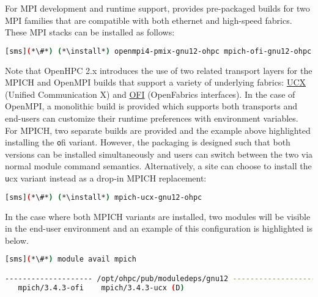 For MPI development and runtime support, \OHPC{} provides pre-packaged builds
for two MPI families that are compatible with both ethernet and high-speed
fabrics.  These MPI stacks can be installed as follows:

\begin{lstlisting}[language=bash]
[sms](*\#*) (*\install*) openmpi4-pmix-gnu12-ohpc mpich-ofi-gnu12-ohpc
\end{lstlisting}

Note that OpenHPC 2.x introduces the use of two related transport layers for
the MPICH and OpenMPI builds that support a variety of underlying
fabrics: \href{https://www.openucx.org}{UCX} (Unified Communication X)
and \href{https://ofiwg.github.io/libfabric/}{OFI} (OpenFabrics interfaces).
In the case of OpenMPI, a monolithic build is provided which supports both
transports and end-users can customize their runtime preferences with
environment variables. For MPICH, two separate builds are provided and the
example above highlighted installing the {\texttt ofi} variant.  However, the
packaging is designed such that both versions can be installed simultaneously
and users can switch between the two via normal module command
semantics. Alternatively, a site can choose to install the {\texttt ucx} variant
instead as a drop-in MPICH replacement:

\begin{lstlisting}[language=bash]
[sms](*\#*) (*\install*) mpich-ucx-gnu12-ohpc
\end{lstlisting}

In the case where both MPICH variants are installed, two modules will be
visible in the end-user environment and an example of this configuration is
highlighted is below.

\begin{lstlisting}[language=bash]
[sms](*\#*) module avail mpich

-------------------- /opt/ohpc/pub/moduledeps/gnu12 ---------------------
   mpich/3.4.3-ofi    mpich/3.4.3-ucx (D)
\end{lstlisting}





